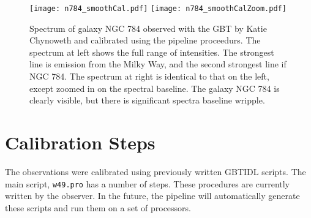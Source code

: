 \documentclass[12pt,twoside]{article}
\begin{document}
\clearpage
\begin{figure}
\vskip -0.75in
\texttt{[image: n784\_smoothCal.pdf]}
\texttt{[image: n784\_smoothCalZoom.pdf]}
\vskip -0.5in
\caption{Spectrum of galaxy NGC 784 observed with the GBT by Katie Chynoweth
and calibrated using the pipeline proceedurs.   The spectrum at left shows the
full range of intensities.  The strongest line is emission from the Milky Way, and
the second strongest line if NGC 784.   The spectrum at right
is identical to that on the left, except zoomed in on the spectral baseline.
The galaxy NGC 784 is clearly visible, but there is significant spectra
baseline wripple.  
}
\end{figure}

\section{Calibration Steps}

The observations were calibrated using previously written GBTIDL scripts.
The main script, {\tt w49.pro} has a number of steps.   These procedures
are currently written by the observer.  In the future, the pipeline will automatically
generate these scripts and run them on a set of processors.
\end{document}
